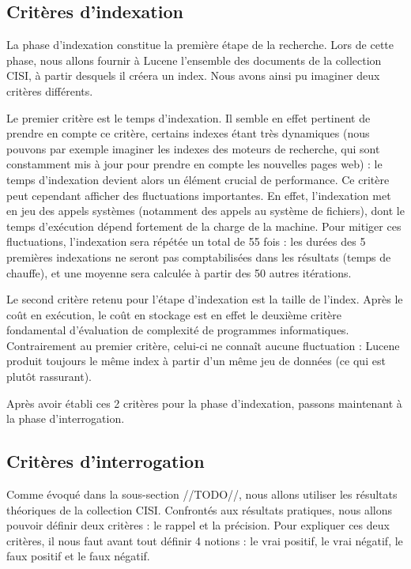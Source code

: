 \subsection{Critères d'indexation}

La phase d’indexation constitue la première étape de la recherche. Lors de cette phase, nous allons fournir à Lucene l’ensemble des documents de la collection CISI, à partir desquels il créera un index. Nous avons ainsi pu imaginer deux critères différents.

Le premier critère est le temps d’indexation. Il semble en effet pertinent de prendre en compte ce critère, certains indexes étant très dynamiques (nous pouvons par exemple imaginer les indexes des moteurs de recherche, qui sont constamment mis à jour pour prendre en compte les nouvelles pages web) : le temps d’indexation devient alors un élément crucial de performance. Ce critère peut cependant afficher des fluctuations importantes. En effet, l’indexation met en jeu des appels systèmes (notamment des appels au système de fichiers), dont le temps d’exécution dépend fortement de la charge de la machine. Pour mitiger ces fluctuations, l’indexation sera répétée un total de 55 fois : les durées des 5 premières indexations ne seront pas comptabilisées dans les résultats (temps de chauffe), et une moyenne sera calculée à partir des 50 autres itérations.

Le second critère retenu pour l’étape d’indexation est la taille de l’index. Après le coût en exécution, le coût en stockage est en effet le deuxième critère fondamental d’évaluation de complexité de programmes informatiques. Contrairement au premier critère, celui-ci ne connaît aucune fluctuation : Lucene produit toujours le même index à partir d’un même jeu de données (ce qui est plutôt rassurant). 

Après avoir établi ces 2 critères pour la phase d’indexation, passons maintenant à la phase d’interrogation.

\subsection{Critères d’interrogation}

Comme évoqué dans la sous-section //TODO//, nous allons utiliser les résultats théoriques de la collection CISI. Confrontés aux résultats pratiques, nous allons pouvoir définir deux critères : le rappel et la précision. Pour expliquer ces deux critères, il nous faut avant tout définir 4 notions : le vrai positif, le vrai négatif, le faux positif et le faux négatif.


